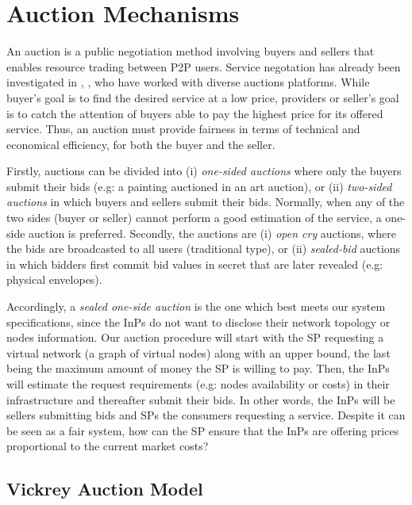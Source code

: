 \section{Auction Mechanisms}

An auction is a public negotiation method involving buyers and sellers that enables resource trading between P2P users. Service negotation has already been investigated in \citep{hausheer2005peermart}, \cite{ogston2002peer}, who have worked with diverse auctions platforms. While buyer's goal is to find the desired service at a low price, providers or seller's goal is to catch the attention of buyers able to pay the highest price for its offered service. Thus, an auction must provide fairness in terms of technical and economical efficiency, for both the buyer and the seller.

Firstly, auctions can be divided into (i) \textit{one-sided auctions} where only the buyers submit their bids (e.g: a painting auctioned in an art auction), or (ii) \textit{two-sided auctions} in which buyers and sellers submit their bids. Normally, when any of the two sides (buyer or seller) cannot perform a good estimation of the service, a one-side auction is preferred. Secondly, the auctions are (i) \textit{open cry} auctions, where the bids are broadcasted to all users (traditional type), or (ii) \textit{sealed-bid} auctions in which bidders first commit bid values in secret that are later revealed (e.g: physical envelopes).

Accordingly, a \textit{sealed one-side auction} is the one which best meets our system specifications, since the InPs do not want to disclose their network topology or nodes information. Our auction procedure will start with the SP requesting a virtual network (a graph of virtual nodes) along with an upper bound, the last being the maximum amount of money the SP is willing to pay. Then, the InPs will estimate the request requirements (e.g: nodes availability or costs) in their infrastructure and thereafter submit their bids. In other words, the InPs will be sellers submitting bids and SPs the consumers requesting a service. Despite it can be seen as a fair system, how can the SP ensure that the InPs are offering prices proportional to the current market costs?

\subsection{Vickrey Auction Model}

